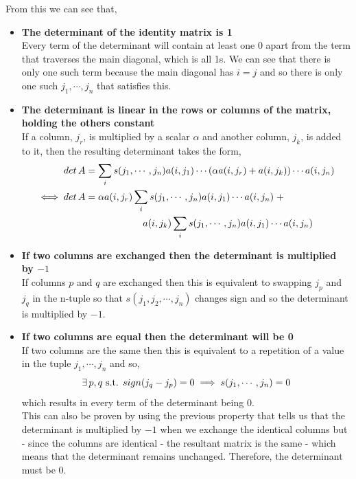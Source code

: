 \documentclass[MathsNotesBase.tex]{subfiles}
\begin{document}
{		From this we can see that,
		\begin{itemize}
			\item{\textbf{The determinant of the identity matrix is 1}}\\
				Every term of the determinant will contain at least one 0 apart from the term that traverses the main diagonal, which is all 1s. We can see that there is only one such term because the main diagonal has $i = j$ and so there is only one such $j_1, \cdots , j_n$ that satisfies this.
			\item{\textbf{The determinant is linear in the rows or columns of the matrix, holding the others constant}}\\
				If a column, $j_r$, is multiplied by a scalar $\alpha$ and another column, $j_k$, is added to it, then the resulting determinant takes the form,
				\begin{align*}
					det\, A &= \sum_{i}s(j_1,\cdots,j_n)a(i,j_1) \cdots (\alpha{a(i,j_r)} + a(i,j_k)) \cdots a(i,j_n)\\
					\iff det\, A &= \alpha{a(i,j_r)}\sum_{i}s(j_1,\cdots,j_n)a(i,j_1) \cdots  a(i,j_n)\; + \\ 
					&\hspace*{60pt} a(i,j_k)\sum_{i}s(j_1,\cdots,j_n)a(i,j_1) \cdots  a(i,j_n)
				\end{align*}
			\item{\textbf{If two columns are exchanged then the determinant is multiplied by $-1$}}\\
				If columns $p$ and $q$ are exchanged then this is equivalent to swapping $j_p$ and $j_q$ in the n-tuple so that $s(j_1,j_2,\cdots,j_n)$ changes sign and so the determinant is multiplied by $-1$.
			\item{\textbf{If two columns are equal then the determinant will be 0}}\\ 
				If two columns are the same then this is equivalent to a repetition of a value in the tuple $j_1, \cdots, j_n$ and so,
				\[ \exists\, p,q \text{ s.t. } sign(j_q - j_p)  = 0 \implies s(j_1,\cdots,j_n) = 0 \]
				which results in every term of the determinant being $0$.\\
				This can also be proven by using the previous property that tells us that the determinant is multiplied by $-1$ when we exchange the identical columns but - since the columns are identical - the resultant matrix is the same - which means that the determinant remains unchanged. Therefore, the determinant must be $0$.
		\end{itemize}
	
}
\end{document}
